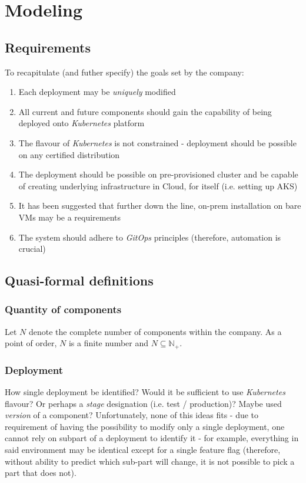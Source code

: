 \documentclass{article}
\begin{document}
\section{Modeling}

\subsection{Requirements}

To recapitulate (and futher specify) the goals set by the company:
\begin{enumerate}
	\item Each deployment may be \emph{uniquely} modified
	\item All current and future components should gain the capability of being deployed onto \emph{Kubernetes} platform
	\item The flavour of \emph{Kubernetes} is not constrained - deployment should be possible on any certified distribution
	\item The deployment should be possible on pre-provisioned cluster and be capable of creating underlying infrastructure in Cloud, for itself (i.e. setting up AKS)
	\item It has been suggested that further down the line, on-prem installation on bare VMs may be a requirements
	\item The system should adhere to \emph{GitOps} principles (therefore, automation is crucial)
\end{enumerate}

\subsection{Quasi-formal definitions}

\subsubsection{Quantity of components}
Let $ N $ denote the complete number of components within the company. As a point of order, $N$ is a finite number and $N \subseteq \mathbb{N}_+$.

\subsubsection{Deployment}
How single deployment be identified? Would it be sufficient to use \emph{Kubernetes} flavour? Or perhaps a \emph{stage} designation (i.e. test / production)? Maybe used \emph{version} of a component? 
Unfortunately, none of this ideas fits - due to requirement of having the possibility to modify only a single deployment, one cannot rely on subpart of a deployment to identify it - 
for example, everything in said environment may be identical except for a single feature flag (therefore, without ability to predict which sub-part will change, it is not possible to pick a part that does not).
\end{document}
